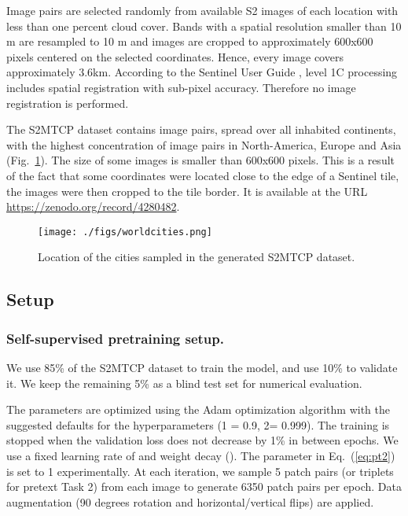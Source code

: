\documentclass[runningheads]{llncs}
\begin{document}
Image pairs  are selected randomly from available S2 images of each location with less than one percent cloud cover. Bands with a spatial resolution smaller than 10 m are resampled to 10 m and images are cropped to approximately 600x600 pixels centered on the selected coordinates. Hence, every image covers approximately 3.6km. According to the Sentinel User Guide \cite{sentinel:2015:user_handbook}, level 1C processing includes spatial registration with sub-pixel accuracy. Therefore no image registration is performed. 

The S2MTCP dataset contains  image pairs, spread over all inhabited continents, with the highest concentration of image pairs in North-America, Europe and Asia (Fig.~\ref{fig:location_worldcities}). The size of some images is smaller than 600x600 pixels. This is a result of the fact that some coordinates were located close to the edge of a Sentinel tile, the images were then cropped to the tile border. {It is available at the URL \url{https://zenodo.org/record/4280482}}.

\begin{figure}[!t]
    \centering
    \texttt{[image: ./figs/worldcities.png]}
    \caption{Location of the cities sampled in the generated S2MTCP dataset.}
    \label{fig:location_worldcities}
\end{figure}

\subsection{Setup}
\subsubsection{Self-supervised pretraining setup.} \label{sec:setup_pretext_task_performance}
We use 85\% of the S2MTCP dataset  to train the model, and use 10\% to validate it. We keep the remaining 5\% as a blind test set for numerical evaluation.

The parameters are optimized using the Adam optimization algorithm \cite{kingma:2014:adam} with the suggested defaults for the hyperparameters (1 = 0.9, 2= 0.999). The training is stopped when the validation loss does not decrease by  1\% in between epochs. We use a fixed learning rate of  and weight decay (). The  parameter in Eq.~(\ref{eq:pt2}) is set to 1 experimentally. At each iteration, we sample 5 patch pairs (or triplets for pretext Task 2) from each image to generate {6350 patch pairs per epoch.} Data augmentation (90 degrees rotation and horizontal/vertical flips) are applied. 
\end{document}
